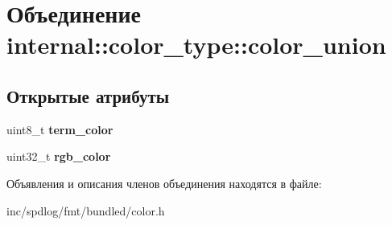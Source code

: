 \hypertarget{unioninternal_1_1color__type_1_1color__union}{}\section{Объединение internal\+:\+:color\+\_\+type\+:\+:color\+\_\+union}
\label{unioninternal_1_1color__type_1_1color__union}
\subsection*{Открытые атрибуты}
\begin{DoxyCompactItemize}
\item 
\mbox{\label{unioninternal_1_1color__type_1_1color__union_ac6843a3cb0050488db9fde54df345b82}} 
uint8\+\_\+t {\bfseries term\+\_\+color}
\item 
\mbox{\label{unioninternal_1_1color__type_1_1color__union_a1c1fa5561b5f884349a6870150a449ae}} 
uint32\+\_\+t {\bfseries rgb\+\_\+color}
\end{DoxyCompactItemize}


Объявления и описания членов объединения находятся в файле\+:\begin{DoxyCompactItemize}
\item 
inc/spdlog/fmt/bundled/color.\+h\end{DoxyCompactItemize}

